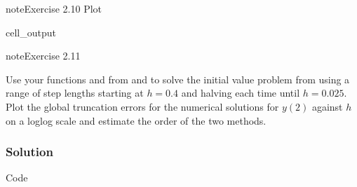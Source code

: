\documentclass[letterpaper,10pt,english]{jupyterBook}
\begin{document}
\begin{sphinxadmonition}{note}{Exercise 2.10}
\sphinxAtStartPar
Plot
\begin{sphinxVerbatimOutput}

\begin{sphinxuseclass}{cell_output}
\noindent{}

\end{sphinxuseclass}\end{sphinxVerbatimOutput}
\end{sphinxadmonition}

\begin{sphinxadmonition}{note}{Exercise 2.11}

\sphinxAtStartPar
Use your functions  and  from {\hyperref[\detokenize{2_ERKs/2.5_ERK_Exercises:ex2-7}]{}} and {\hyperref[\detokenize{2_ERKs/2.5_ERK_Exercises:ex2-10}]{}} to solve the initial value problem from {\hyperref[\detokenize{2_ERKs/2.5_ERK_Exercises:ex2-6}]{}} using a range of step lengths starting at \(h=0.4\) and halving each time until \(h=0.025\). Plot the global truncation errors for the numerical solutions for \(y(2)\) against \(h\) on a loglog scale and estimate the order of the two methods.
\subsubsection*{Solution}

\sphinxAtStartPar
Code


\end{sphinxadmonition}
\end{document}
